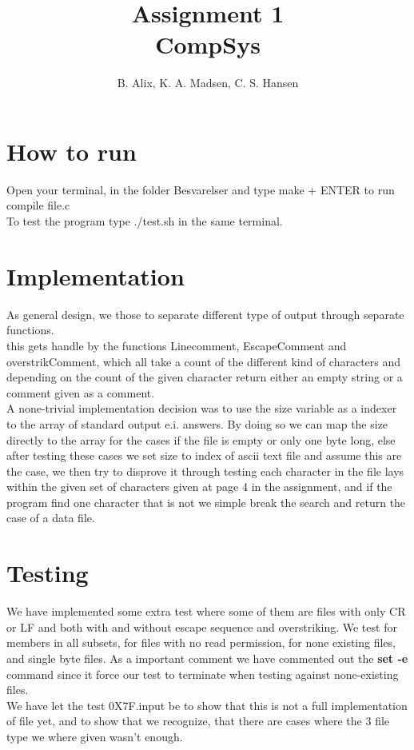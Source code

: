 \documentclass[12pt,a4paper]{article}
\author{B. Alix, K. A. Madsen, C. S. Hansen}
\title{Assignment 1 \\ CompSys}
\begin{document}
\clearpage\maketitle
\thispagestyle{empty}
\setcounter{page}{0}
\newpage

\section*{How to run}
Open your terminal, in the folder Besvarelser and type make + ENTER to run compile file.c
\\[10pt]
To test the program type ./test.sh in the same terminal.
\\[10pt]
\section*{Implementation}
As general design, we those to separate different type of output through separate functions. 
\\
this gets handle by the functions Linecomment, EscapeComment and overstrikComment, 
which all take a count of the different kind of characters and depending on the count of the given character return either an empty string or a comment given as a comment.
\\
A none-trivial implementation decision was to use the size variable as a indexer to the array of standard output e.i. answers. By doing so we can map the size directly to the array for the cases if the file is empty or only one byte long, else after testing these cases we set size to index of ascii text file and assume this are the case, we then try to disprove it through testing each character in the file lays within the given set of characters given at page 4 in the assignment, and if the program find one character that is not we simple break the search and return the case of a data file.

\section*{Testing}
We have implemented some extra test where some of them are files with only CR or LF and both with and without escape sequence and overstriking. We test for members in all subsets, for files with no read permission, for none existing files, and single byte files. As a important comment we have commented out the \textbf{set -e} command since it force our test to terminate when testing against none-existing files.
\\[10pt]
We have let the test 0X7F.input be to show that this is not a full implementation of file yet, and to show that we recognize, that there are cases where the 3 file type we where given wasn't enough. 
\end{document}
